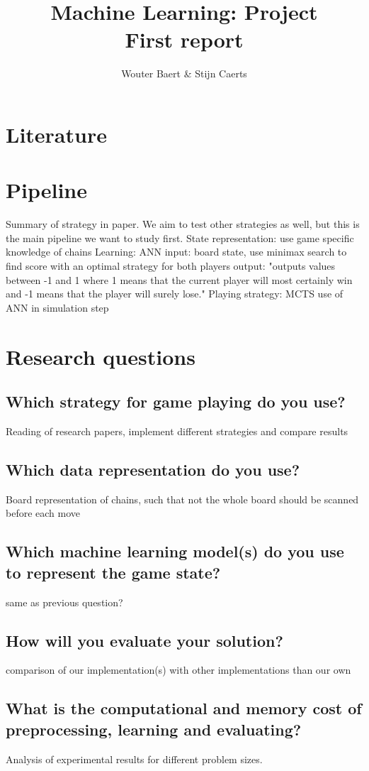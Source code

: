 \documentclass[11pt,a4paper]{article}
\author{Wouter Baert \& Stijn Caerts}
\title{Machine Learning: Project \\ \small{First report}}
\begin{document}
	\maketitle
	\section{Literature}
	\section{Pipeline}
	Summary of strategy in paper. We aim to test other strategies as well, but this is the main pipeline we want to study first.
	State representation: use game specific knowledge of chains
	Learning: ANN
		input: board state, use minimax search to find score with an optimal strategy for both players
		output: "outputs values between -1 and 1 where 1 means that
		the current player will most certainly win and -1 means that
		the player will surely lose."
	Playing strategy: MCTS
		use of ANN in simulation step
	\section{Research questions}
	\subsection{Which strategy for game playing do you use?}
	Reading of research papers, implement different strategies and compare results
	\subsection{Which data representation do you use?}
	Board representation of chains, such that not the whole board should be scanned before each move
	\subsection{Which machine learning model(s) do you use to represent the game state?}
	same as previous question?
	\subsection{How will you evaluate your solution?}
	comparison of our implementation(s) with other implementations than our own
	
	\subsection{What is the computational and memory cost of preprocessing, learning and evaluating?}
	Analysis of experimental results for different problem sizes.
	
\end{document}
